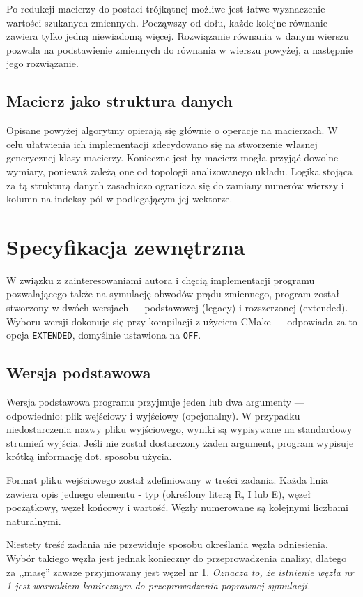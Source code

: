 \documentclass[11pt, final]{article}
\begin{document}
Po redukcji macierzy do postaci trójkątnej możliwe jest łatwe wyznaczenie wartości szukanych zmiennych.
Począwszy od dołu, każde kolejne równanie zawiera tylko jedną niewiadomą więcej. Rozwiązanie równania w danym wierszu
pozwala na podstawienie zmiennych do równania w wierszu powyżej, a następnie jego rozwiązanie.

\subsection{Macierz jako struktura danych}
Opisane powyżej algorytmy opierają się głównie o operacje na macierzach. W celu ułatwienia ich implementacji zdecydowano się na stworzenie własnej generycznej klasy macierzy. Konieczne jest by macierz mogła przyjąć dowolne wymiary, ponieważ zależą one od topologii analizowanego układu. Logika stojąca za tą strukturą danych zasadniczo ogranicza się do zamiany numerów wierszy i kolumn na indeksy pól w podlegającym jej wektorze.

\section{Specyfikacja zewnętrzna}
W związku z zainteresowaniami autora i chęcią implementacji programu pozwalającego także na symulację obwodów prądu zmiennego, program został stworzony w dwóch wersjach --- podstawowej (legacy) i rozszerzonej (extended). Wyboru wersji dokonuje się przy kompilacji z użyciem CMake --- odpowiada za to opcja \texttt{EXTENDED}, domyślnie ustawiona na \texttt{OFF}.


\subsection{Wersja podstawowa}
Wersja podstawowa programu przyjmuje jeden lub dwa argumenty --- odpowiednio: plik wejściowy i wyjściowy (opcjonalny). W przypadku niedostarczenia nazwy pliku wyjściowego, wyniki są wypisywane na standardowy
strumień wyjścia. Jeśli nie został dostarczony żaden argument, program wypisuje krótką informację dot. sposobu użycia.

Format pliku wejściowego został zdefiniowany w treści zadania. Każda linia zawiera opis jednego elementu - typ (określony literą R, I lub E), węzeł początkowy, węzeł końcowy i wartość. Węzły numerowane są kolejnymi liczbami naturalnymi.

Niestety treść zadania nie przewiduje sposobu określania węzła odniesienia. Wybór takiego węzła jest jednak konieczny do przeprowadzenia analizy, dlatego za ,,masę'' zawsze przyjmowany jest węzeł nr 1. \emph{Oznacza to, że
istnienie węzła nr 1 jest warunkiem koniecznym do przeprowadzenia poprawnej symulacji.}
\end{document}
